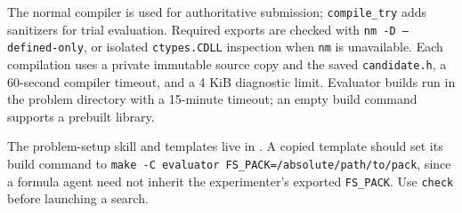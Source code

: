 \documentclass[11pt]{article}
\newcommand{\code}[1]{\texttt{#1}}
\begin{document}
The normal compiler is used for authoritative submission; \code{compile\_try}
adds sanitizers for trial evaluation. Required exports are checked with
\code{nm -D --defined-only}, or isolated \code{ctypes.CDLL} inspection when
\code{nm} is unavailable. Each compilation uses a private immutable source
copy and the saved \code{candidate.h}, a 60-second compiler timeout, and a
4 KiB diagnostic limit. Evaluator builds run in the problem directory with
a 15-minute timeout; an empty build command supports a prebuilt library.

The problem-setup skill and templates live in
. A copied template should set its build
command to \code{make -C evaluator FS\_PACK=/absolute/path/to/pack}, since a
formula agent need not inherit the experimenter's exported \code{FS\_PACK}.
Use \code{check} before launching a search.
\end{document}
